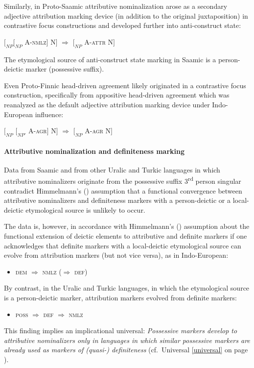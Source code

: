 Similarly, in Proto\hyp{}Saamic attributive nominalization arose as a secondary adjective attribution marking device (in addition to the original juxtaposition) in contrastive focus constructions and developed further into anti-construct state:
\begin{exe}
\ex \rm{$[_{NP} [_{NP}$ A-\textsc{nmlz}$]$ N$]$ $\Rightarrow$ $[_{NP}$ A-\textsc{attr} N$]$}
\end{exe}
The etymological source of anti-construct state marking in Saamic is a person-deictic marker (possessive suffix).

Even Proto\hyp{}Finnic head\hyp{}driven agreement likely originated in a contrastive focus construction, specifically from appositive head\hyp{}driven agreement which was reanalyzed as the default adjective attribution marking device under Indo-European influence:
\begin{exe}
\ex \rm{$[_{NP}$ $[_{NP'}$ A-\textsc{agr}$]$ N$]$ $\Rightarrow$ $[_{NP}$ A-\textsc{agr} N$]$}
\end{exe}

\paragraph{Attributive nominalization and definiteness marking}
Data from Saamic and from other Uralic and Turkic languages in which attributive nominalizers originate from the possessive suffix 3\textsuperscript{rd} person singular contradict Himmelmann's (\citeyear[220–221]{himmelmann1997}) assumption that a functional convergence between attributive nominalizers and definiteness markers with a person-deictic or a local-deictic etymological source is unlikely to occur. 

The data is, however, in accordance with Himmelmann's (\citeyear[220–221]{himmelmann1997}) assumption about the functional extension of deictic elements to attributive and definite markers if one acknowledges that definite markers with a local-deictic etymological source can evolve from attribution markers (but not vice versa), as in Indo-European:
\begin{itemize}
\item \textsc{dem $\Rightarrow$ nmlz ($\Rightarrow$ def)}
\end{itemize}
By contrast, in the Uralic and Turkic languages, in which the etymological source is a person-deictic marker, attribution markers evolved from definite markers:
\begin{itemize}
\item \textsc{poss $\Rightarrow$ def $\Rightarrow$ nmlz}
\end{itemize}
This finding implies an implicational universal: \textit{Possessive markers develop to attributive nominalizers only in languages in which similar possessive markers are already used as markers of (quasi-) definiteness} (cf.~Universal \ref{universal} on page \pageref{universal}).

